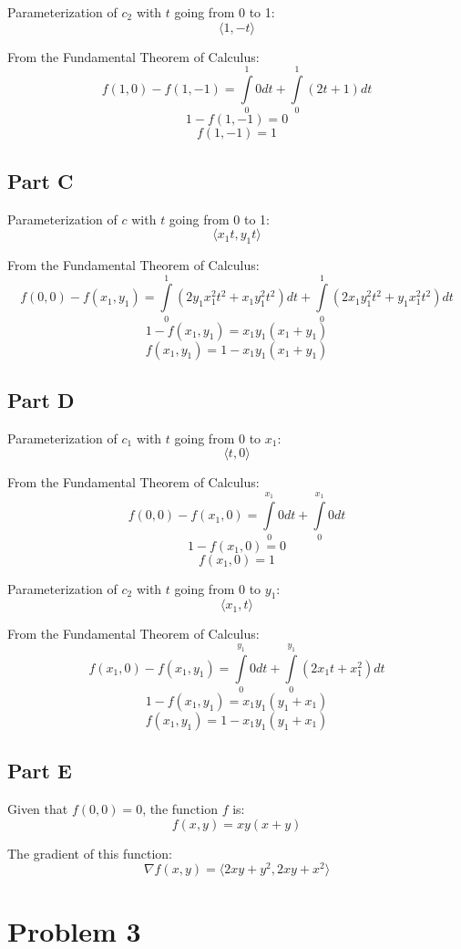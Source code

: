 \documentclass{article}
\begin{document}
Parameterization of $c_2$ with $t$ going from 0 to 1:
$$ \langle 1, -t \rangle $$

From the Fundamental Theorem of Calculus:
$$ f(1, 0) - f(1,-1) = \int\limits_0^1 0 dt + \int\limits_0^1 (2t + 1) dt $$
$$ 1 - f(1, -1) = 0 $$
$$ f(1, -1) = 1 $$ 

\subsection*{Part C}

Parameterization of $c$ with $t$ going from 0 to 1:
$$ \langle x_1 t, y_1 t \rangle $$

From the Fundamental Theorem of Calculus:
$$ f(0, 0) - f(x_1, y_1) = \int\limits_0^1 ( 2 y_1 x_1^2 t^2 + x_1 y_1^2 t^2 )
dt + \int\limits_0^1 (2 x_1 y_1^2 t^2 + y_1 x_1^2 t^2) dt $$
$$ 1 - f(x_1, y_1) = x_1 y_1 (x_1 + y_1) $$
$$ f(x_1, y_1) = 1 - x_1 y_1 (x_1 + y_1) $$

\subsection*{Part D}

Parameterization of $c_1$ with $t$ going from 0 to $x_1$:
$$ \langle t, 0 \rangle $$

From the Fundamental Theorem of Calculus:
$$ f(0, 0) - f(x_1, 0) = \int\limits_0^{x_1} 0 dt + \int\limits_0^{x_1} 0 dt $$
$$ 1 - f(x_1,0) = 0 $$
$$ f(x_1, 0) = 1 $$

Parameterization of $c_2$ with $t$ going from 0 to $y_1$:
$$ \langle x_1, t \rangle $$

From the Fundamental Theorem of Calculus:
$$ f(x_1, 0) - f(x_1, y_1) = \int\limits_0^{y_1} 0 dt + \int\limits_0^{y_1}
(2 x_1 t + x_1^2 ) dt $$
$$ 1 - f(x_1, y_1) = x_1 y_1 (y_1 + x_1) $$
$$ f(x_1, y_1) = 1 - x_1 y_1 (y_1 + x_1) $$

\subsection*{Part E}

Given that $f(0, 0) = 0$, the function $f$ is:
$$ f(x, y) = x y (x + y)$$

The gradient of this function:
$$ \nabla f(x, y) = \langle 2xy + y^2, 2xy + x^2 \rangle $$

\section*{Problem 3}
\end{document}
